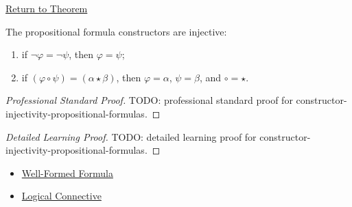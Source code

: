 \newpage
{}
\label{prf:constructor-injectivity-propositional-formulas}

\begin{remark*}[Return]
\hyperref[lem:constructor-injectivity-propositional-formulas]{Return to Theorem}
\end{remark*}

\begin{theorem*}
The propositional formula constructors are injective:
\begin{enumerate}
\item if \(\neg\varphi=\neg\psi\), then \(\varphi=\psi\);
\item if \((\varphi\circ\psi)=(\alpha\star\beta)\), then \(\varphi=\alpha\), \(\psi=\beta\), and \(\circ=\star\).
\end{enumerate}
\end{theorem*}

\begin{proof}[Professional Standard Proof]
\LRAProofBodyStart
TODO: professional standard proof for constructor-injectivity-propositional-formulas.
\end{proof}

\begin{proof}[Detailed Learning Proof]
\LRAProofBodyStart
TODO: detailed learning proof for constructor-injectivity-propositional-formulas.
\end{proof}

\begin{remark*}
\end{remark*}

\begin{dependencies}
\begin{itemize}
  \item \hyperref[def:well-formed-formula]{Well-Formed Formula}
  \item \hyperref[def:logical-connective]{Logical Connective}
\end{itemize}
\end{dependencies}

\clearpage
